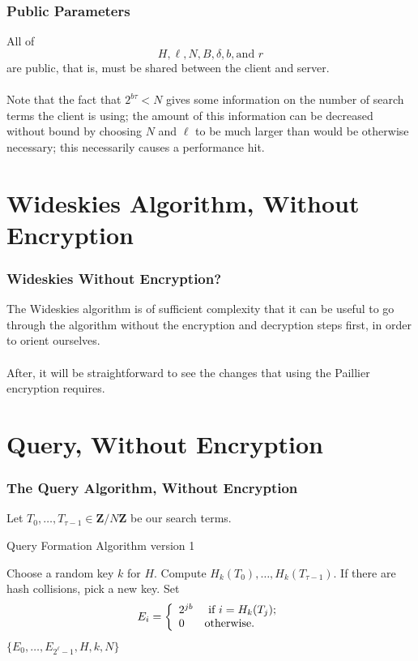 \documentclass{beamer}
\makeatletter
\newcommand{\Z}{\ensuremath{\mathbf{Z}}}
\newcommand{\zmodn}{\ensuremath{\Z/N\Z}}
\DeclareRobustCommand*{\&}{%
  \nfss@text{%
    \fontfamily{LinuxBiolinumT-TLF}%
    \selectfont
    \symbol{`\&}%
  }%
}
\makeatother
\begin{document}
\begin{frame}
  \frametitle{Public Parameters}
  All of \begin{equation*}H, \ell, N, B, \delta, b, \text{and } r\end{equation*}
  are public, that is, must be shared between the client and server.\\~\\

  Note that the fact that $2^{b\tau} < N$ gives some information on the number
  of search terms the client is using; the amount of this information can be
  decreased without bound by choosing $N$ and $\ell$ to be much larger than
  would be otherwise necessary; this necessarily causes a performance hit.
\end{frame}

\section{Wideskies Algorithm, Without Encryption}
\begin{frame}
  \frametitle{Wideskies Without Encryption?}
  The Wideskies algorithm is of sufficient complexity that it can be useful to
  go through the algorithm without the encryption and decryption steps first,
  in order to orient ourselves.\\~\\
  After, it will be straightforward to see the
  changes that using the Paillier encryption requires.
\end{frame}

\section{Query, Without Encryption}
\begin{frame}
  \frametitle{The Query Algorithm, Without Encryption}
  Let $T_0,\ldots,T_{\tau-1}\in\zmodn$ be our search terms.
  \begin{algorithm}[H]
  \caption{Query Formation Algorithm version
    1}\label{alg.plain_form_1}
\begin{algorithmic}[1]
  \State\label{step.key}Choose a random key \(k\) for \(H\).
  \State Compute \(H_{k}(T_{0}),\ldots,H_{k}(T_{\tau-1})\).
  \State {}
  \Comment If there are hash collisions, pick a new key.
  \EndWhile
  \State\label{step.set}Set \begin{equation*}
    E_{i} = \left\{\begin{array}{l l} 
    2^{jb} & \mbox{ if } i = H_{k}(T_{j}); \\
    0 & \mbox{otherwise.}
    \end{array}
    \right.
  \end{equation*}
  \EndFor
  \State\Return \(\{E_{0},\ldots,E_{2^{\ell}-1}, H, k, N\}\)
\end{algorithmic}
\end{algorithm}
\end{frame}
\end{document}
